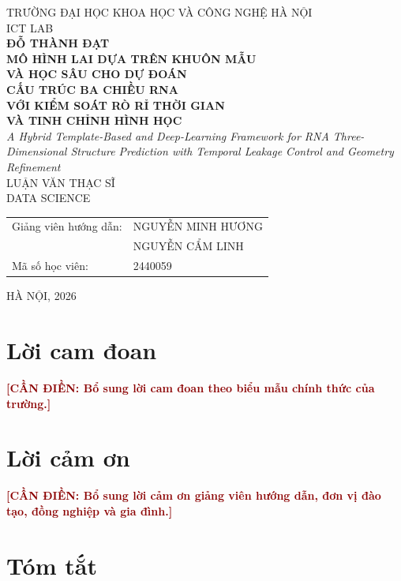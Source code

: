 \documentclass[12pt,a4paper,oneside]{report}
\newcommand{\todo}[1]{\textcolor{darkred}{\textbf{[CẦN ĐIỀN: #1]}}}
\begin{document}
\begin{titlepage}
\begin{center}
  {\large TRƯỜNG ĐẠI HỌC KHOA HỌC VÀ CÔNG NGHỆ HÀ NỘI}\\[0.25cm]
  {\large ICT LAB}\\[1.6cm]
  {\Large\bfseries ĐỖ THÀNH ĐẠT}\\[1.5cm]
  {\Large\bfseries
  MÔ HÌNH LAI DỰA TRÊN KHUÔN MẪU\\
  VÀ HỌC SÂU CHO DỰ ĐOÁN\\
  CẤU TRÚC BA CHIỀU RNA\\
  VỚI KIỂM SOÁT RÒ RỈ THỜI GIAN\\
  VÀ TINH CHỈNH HÌNH HỌC
  }\\[1.0cm]
  {\large\itshape
  A Hybrid Template-Based and Deep-Learning Framework for RNA Three-Dimensional
  Structure Prediction with Temporal Leakage Control and Geometry Refinement
  }\\[1.5cm]
  {\large LUẬN VĂN THẠC SĨ}\\[0.5cm]
  {\large DATA SCIENCE}\\[1.6cm]
  \begin{tabularx}{0.94\textwidth}{lX}
  Giảng viên hướng dẫn: & NGUYỄN MINH HƯƠNG\\
  & NGUYỄN CẨM LINH\\
  Mã số học viên: & 2440059
  \end{tabularx}
  \vfill
  {\large HÀ NỘI, 2026}
\end{center}
\end{titlepage}


\chapter*{Lời cam đoan}
\todo{Bổ sung lời cam đoan theo biểu mẫu chính thức của trường.}

\chapter*{Lời cảm ơn}
\todo{Bổ sung lời cảm ơn giảng viên hướng dẫn, đơn vị đào tạo, đồng nghiệp và gia đình.}

\chapter*{Tóm tắt}
\end{document}

